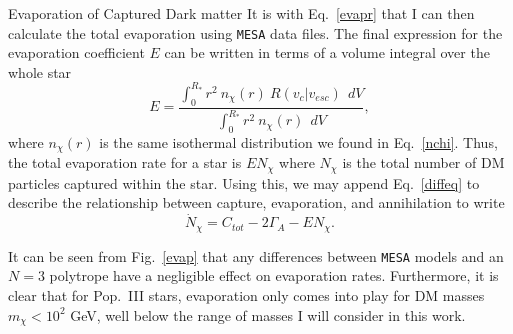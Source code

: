 \documentclass[a4paper,11pt]{article}
\begin{document}
\begin{section}{Evaporation of Captured Dark matter}
    It is with Eq.~\ref{evapr} that I can then calculate the total evaporation using \texttt{MESA} data files. 
    The final expression for the evaporation coefficient $E$ can be written in terms of a volume integral over the whole star
    \begin{equation}
        E = \frac{\int_0^{R_*} r^2~ n_\chi(r)~ R(v_c | v_{esc})~~ dV}{\int_0^{R_*} r^2~ n_\chi(r) ~~dV},
    \end{equation}
    where $n_\chi(r)$ is the same isothermal distribution we found in Eq.~\ref{nchi}. 
    Thus, the total evaporation rate for a star is $E N_\chi$ where $N_\chi$ is the total number of DM particles captured within the star.
    Using this, we may append Eq.~\ref{diffeq} to describe the relationship between capture, evaporation, and annihilation to write
    \begin{equation}
        \dot{N}_\chi = C_{tot} - 2\Gamma_A - E N_\chi.
        \label{newdiffeq}
    \end{equation}

    It can be seen from Fig.~\ref{evap} that any differences between \texttt{MESA} models and an $N=3$ polytrope have a negligible effect on evaporation rates. 
    Furthermore, it is clear that for Pop.~III stars, evaporation only comes into play for DM masses $m_\chi < 10^2$ GeV, well below the range of masses I will consider in this work. 
\end{section}
\end{document}
